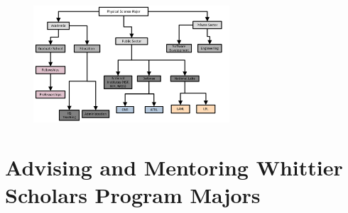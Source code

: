\documentclass[../../main.tex]{subfiles}
\begin{document}
\begin{figure}[hb]
\centering
\includegraphics[width=0.65\textwidth]{figures/tree.pdf}
\caption{\label{fig:tree}}
\end{figure}

\section{Advising and Mentoring Whittier Scholars Program Majors}
\end{document}
